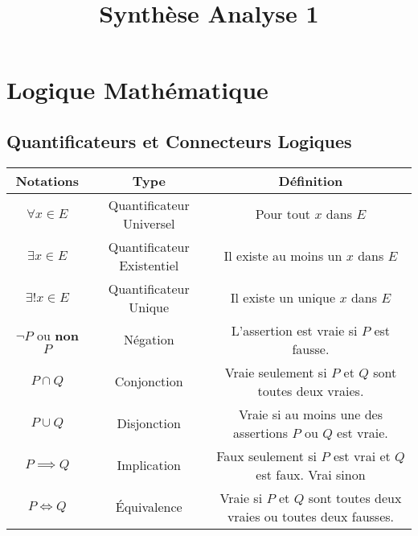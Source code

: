 \documentclass[a4paper,10pt]{article}
\title{Synthèse Analyse 1}
\date{}
\begin{document}
\maketitle

\section*{Logique Mathématique}
\subsection*{Quantificateurs et Connecteurs Logiques}

\begin{center}
\footnotesize %
\begin{tabular}{|c|c|c|}
\hline
\textbf{Notations} & \textbf{Type} & \textbf{Définition} \\
\hline
\( \forall x \in E \) & Quantificateur Universel & Pour tout \( x \) dans \( E \)\\
\hline
\( \exists x \in E \) & Quantificateur Existentiel & Il existe au moins un \( x \) dans \( E \)\\
\hline
\( \exists! x \in E \) & Quantificateur Unique & Il existe un unique \( x \) dans \( E \)\\
\hline
\( \neg P \) ou \textbf{non \(P\)} & Négation & L'assertion est vraie si \( P \) est fausse. \\
\hline
\( P \cap Q \) & Conjonction & Vraie seulement si \( P \) et \( Q \) sont toutes deux vraies. \\
\hline
\( P \cup Q \) & Disjonction & Vraie si au moins une des assertions \( P \) ou \( Q \) est vraie. \\
\hline
\( P \implies Q \) & Implication & Faux seulement si \( P \) est vrai et \( Q \) est faux. Vrai sinon \\
\hline
\( P \iff Q \) & Équivalence & Vraie si \( P \) et \( Q \) sont toutes deux vraies ou toutes deux fausses. \\
\hline
\end{tabular}
\end{center}
\end{document}
